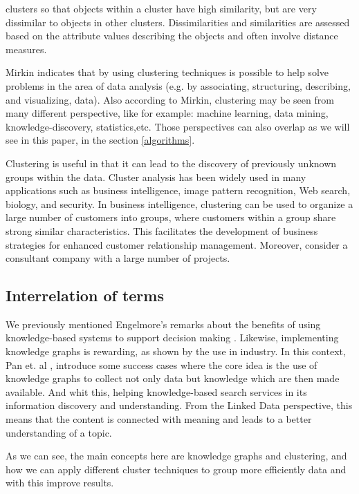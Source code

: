 \documentclass[runningheads]{llncs}
\begin{document}
clusters so that objects within a cluster have high similarity, but are very dissimilar to objects in other clusters. Dissimilarities and similarities are assessed based on the attribute values describing the objects and often involve distance measures. \cite{Han}

Mirkin \cite{Mirkin} indicates that by using clustering techniques is possible to help solve problems in the area of data analysis (e.g. by associating, structuring, describing, and visualizing, data). Also according to Mirkin, clustering may be seen from many different perspective, like for example: machine learning, data mining, knowledge-discovery, statistics,etc. Those perspectives can also overlap as we will see in this paper, in the section \ref{algorithms}.

Clustering is useful in that it can lead to the discovery of previously unknown groups within the data. Cluster analysis has been widely used in many applications such as business intelligence, image pattern recognition, Web search, biology, and security. In business intelligence, clustering can be used to organize a large number of customers into groups, where customers within a group share strong similar characteristics. This facilitates the development of business strategies for enhanced customer relationship management. Moreover, consider a consultant company with a large number of projects. \cite{Han}


\subsection{Interrelation of terms} \label{interrelation}
We previously mentioned Engelmore's remarks about the benefits of using knowledge-based systems to support decision making \cite{Engelmore}. Likewise, implementing knowledge graphs is rewarding, as shown by the use in industry. In this context, Pan et. al \cite{Pan}, introduce some success cases where the core idea is the use of knowledge graphs to collect not only data but knowledge which are then made available. And whit this, helping knowledge-based search services in its information discovery and understanding. 
From the Linked Data perspective, this means that the content is connected with meaning and leads to a better understanding of a topic. \cite{Pan}

As we can see, the main concepts here are knowledge graphs and clustering, and how we can apply different cluster techniques to group more efficiently data and with this improve results.
\end{document}
